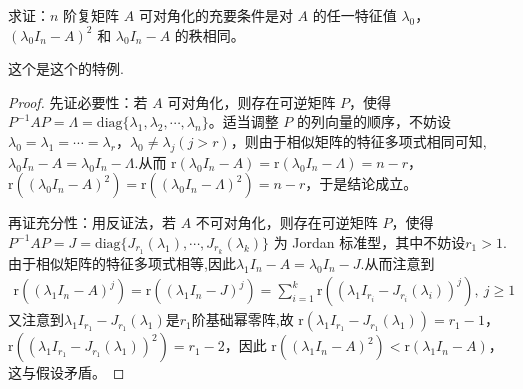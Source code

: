 \documentclass[../../main.tex]{subfiles}
\begin{document}
\begin{proposition}\label{proposition:线性变换可对角化的代数充要条件2}
求证：$n$ 阶复矩阵 $A$ 可对角化的充要条件是对 $A$ 的任一特征值 $\lambda_0$，$(\lambda_0I_n - A)^2$ 和 $\lambda_0I_n - A$ 的秩相同。
\end{proposition}
\begin{remark}
这个是这个的特例.
\end{remark}
\begin{proof}
{\heiti 先证必要性：}若 $A$ 可对角化，则存在可逆矩阵 $P$，使得 $P^{-1}AP = \Lambda = \mathrm{diag}\{\lambda_1,\lambda_2,\cdots,\lambda_n\}$。适当调整 $P$ 的列向量的顺序，不妨设 $\lambda_0 = \lambda_1 = \cdots = \lambda_r$，$\lambda_0\neq\lambda_j (j > r)$，则由于相似矩阵的特征多项式相同可知,$\lambda_0I_n-A=\lambda_0I_n-\Lambda$.从而 $\mathrm{r}(\lambda_0I_n - A)=\mathrm{r}(\lambda_0I_n - \Lambda)=n - r$，$\mathrm{r}((\lambda_0I_n - A)^2)=\mathrm{r}((\lambda_0I_n - \Lambda)^2)=n - r$，于是结论成立。

{\heiti 再证充分性：}用反证法，若 $A$ 不可对角化，则存在可逆矩阵 $P$，使得 $P^{-1}AP = J = \mathrm{diag}\{J_{r_1}(\lambda_1),\cdots,J_{r_k}(\lambda_k)\}$ 为 Jordan 标准型，其中不妨设$r_1 > 1$.由于相似矩阵的特征多项式相等,因此$\lambda_1I_n-A=\lambda_0I_n-J$.从而注意到
\begin{align*}
\mathrm{r}((\lambda_1I_n - A)^j)=\mathrm{r}((\lambda_1I_n - J)^j)=\sum_{i = 1}^{k}\mathrm{r}((\lambda_1I_{r_i} - J_{r_i}(\lambda_i))^j),\ j\geq 1
\end{align*}
又注意到$\lambda_1I_{r_1}-J_{r_1}(\lambda_1)$是$r_1$阶基础幂零阵,故
$\mathrm{r}(\lambda_1I_{r_1} - J_{r_1}(\lambda_1))=r_1 - 1$，$\mathrm{r}((\lambda_1I_{r_1} - J_{r_1}(\lambda_1))^2)=r_1 - 2$，因此 $\mathrm{r}((\lambda_1I_n - A)^2)<\mathrm{r}(\lambda_1I_n - A)$，这与假设矛盾。
\end{proof}
\end{document}
